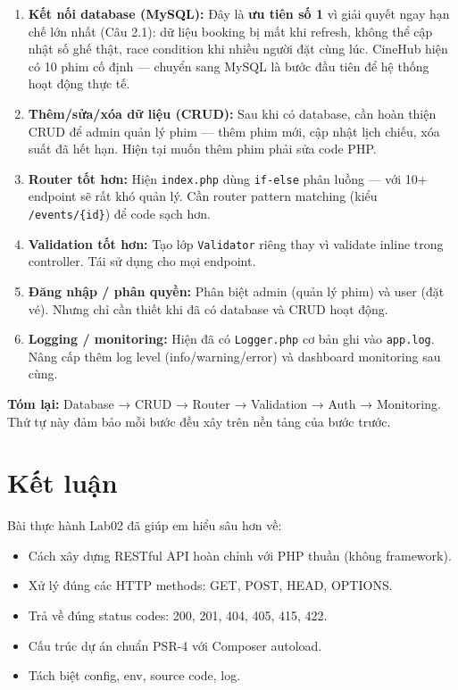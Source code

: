 \documentclass[12pt,a4paper]{article}
\begin{document}
\begin{enumerate}
    \item \textbf{Kết nối database (MySQL):} Đây là \textbf{ưu tiên số 1} vì giải quyết ngay hạn chế lớn nhất (Câu 2.1): dữ liệu booking bị mất khi refresh, không thể cập nhật số ghế thật, race condition khi nhiều người đặt cùng lúc. CineHub hiện có 10 phim cố định — chuyển sang MySQL là bước đầu tiên để hệ thống hoạt động thực tế.

    \item \textbf{Thêm/sửa/xóa dữ liệu (CRUD):} Sau khi có database, cần hoàn thiện CRUD để admin quản lý phim — thêm phim mới, cập nhật lịch chiếu, xóa suất đã hết hạn. Hiện tại muốn thêm phim phải sửa code PHP.

    \item \textbf{Router tốt hơn:} Hiện \texttt{index.php} dùng \texttt{if-else} phân luồng — với 10+ endpoint sẽ rất khó quản lý. Cần router pattern matching (kiểu \texttt{/events/\{id\}}) để code sạch hơn.

    \item \textbf{Validation tốt hơn:} Tạo lớp \texttt{Validator} riêng thay vì validate inline trong controller. Tái sử dụng cho mọi endpoint.

    \item \textbf{Đăng nhập / phân quyền:} Phân biệt admin (quản lý phim) và user (đặt vé). Nhưng chỉ cần thiết khi đã có database và CRUD hoạt động.

    \item \textbf{Logging / monitoring:} Hiện đã có \texttt{Logger.php} cơ bản ghi vào \texttt{app.log}. Nâng cấp thêm log level (info/warning/error) và dashboard monitoring sau cùng.
\end{enumerate}

\textbf{Tóm lại:} Database → CRUD → Router → Validation → Auth → Monitoring. Thứ tự này đảm bảo mỗi bước đều xây trên nền tảng của bước trước.

\newpage

\section{Kết luận}

Bài thực hành Lab02 đã giúp em hiểu sâu hơn về:
\begin{itemize}[noitemsep]
    \item Cách xây dựng RESTful API hoàn chỉnh với PHP thuần (không framework).
    \item Xử lý đúng các HTTP methods: GET, POST, HEAD, OPTIONS.
    \item Trả về đúng status codes: 200, 201, 404, 405, 415, 422.
    \item Cấu trúc dự án chuẩn PSR-4 với Composer autoload.
    \item Tách biệt config, env, source code, log.
\end{itemize}
\end{document}
